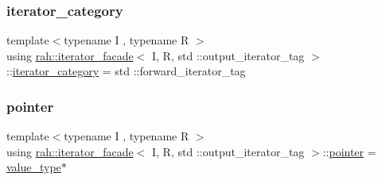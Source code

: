 \subsubsection{\texorpdfstring{iterator\_category}{iterator\_category}\hspace{0.1cm}{\footnotesize\ttfamily [2/2]}}
{\footnotesize\ttfamily template$<$typename I , typename R $>$ \\
using \mbox{\hyperlink{structrah_1_1iterator__facade}{rah\+::iterator\+\_\+facade}}$<$ I, R, std \+::output\+\_\+iterator\+\_\+tag $>$\+::\mbox{\hyperlink{structrah_1_1iterator__facade_3_01_i_00_01_r_00_01std_01_1_1output__iterator__tag_01_4_a465bbb8a7a2ae321b8183e3c9e727423}{iterator\+\_\+category}} =  std \+::forward\+\_\+iterator\+\_\+tag}

\mbox{\label{structrah_1_1iterator__facade_3_01_i_00_01_r_00_01std_01_1_1output__iterator__tag_01_4_aaa99676a12d594e70c36d9c6fc3deb52}} 
\subsubsection{\texorpdfstring{pointer}{pointer}\hspace{0.1cm}{\footnotesize\ttfamily [1/2]}}
{\footnotesize\ttfamily template$<$typename I , typename R $>$ \\
using \mbox{\hyperlink{structrah_1_1iterator__facade}{rah\+::iterator\+\_\+facade}}$<$ I, R, std \+::output\+\_\+iterator\+\_\+tag $>$\+::\mbox{\hyperlink{structrah_1_1iterator__facade_3_01_i_00_01_r_00_01std_01_1_1output__iterator__tag_01_4_aaa99676a12d594e70c36d9c6fc3deb52}{pointer}} =  \mbox{\hyperlink{structrah_1_1iterator__facade_3_01_i_00_01_r_00_01std_01_1_1output__iterator__tag_01_4_ad112e27b0b6caafdfab6cd47bbc66e73}{value\+\_\+type}}$\ast$}

\mbox{\label{structrah_1_1iterator__facade_3_01_i_00_01_r_00_01std_01_1_1output__iterator__tag_01_4_aaa99676a12d594e70c36d9c6fc3deb52}} 
